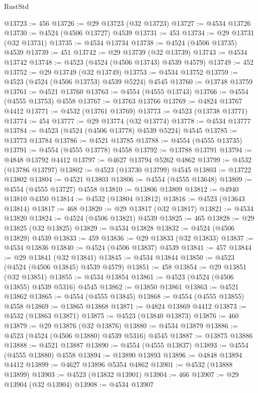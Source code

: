 \begin{lexlean}{RustStd}
\begin{coremodule}
@13723 := 456
@13726 := @29 @13723 (@32 @13723)
@13727 := @4534 @13726
@13730 := @4524 (@4506 @13727) @4539
@13731 := 453
@13734 := @29 @13731 (@32 @13731)
@13735 := @4534 @13734
@13738 := @4524 (@4506 @13735) @4539
@13739 := 451
@13742 := @29 @13739 (@32 @13739)
@13743 := @4534 @13742
@13748 := @4523 (@4524 (@4506 @13743) @4539 @4579)
@13749 := 452
@13752 := @29 @13749 (@32 @13749)
@13753 := @4534 @13752
@13759 := @4523 (@4524 (@4506 @13753) @4539 @5224) @4545
@13760 := @13748 @13759
@13761 := @4521 @13760
@13763 := @4554 (@4555 @13743)
@13766 := @4554 (@4555 @13753) @4558
@13767 := @13763 @13766
@13769 := @4824 @13767 @4412
@13771 := @4532 (@13761 @13769)
@13773 := @4523 (@13738 @13771)
@13774 := 454
@13777 := @29 @13774 (@32 @13774)
@13778 := @4534 @13777
@13784 := @4523 (@4524 (@4506 @13778) @4539 @5224) @4545
@13785 := @13773 @13784
@13786 := @4521 @13785
@13788 := @4554 (@4555 @13735)
@13791 := @4554 (@4555 @13778) @4558
@13792 := @13788 @13791
@13794 := @4848 @13792 @4412
@13797 := @4627 @13794 @5262 @4862
@13799 := @4532 (@13786 @13797)
@13802 := @4523 (@13730 @13799) @4545
@13803 := @13722 @13802
@13804 := @4521 @13803
@13806 := @4554 (@4555 @13648)
@13809 := @4554 (@4555 @13727) @4558
@13810 := @13806 @13809
@13812 := @4940 @13810 @4350
@13814 := @4532 (@13804 @13812)
@13816 := @4523 (@13643 @13814)
@13817 := 468
@13820 := @29 @13817 (@32 @13817)
@13821 := @4534 @13820
@13824 := @4524 (@4506 @13821) @4539
@13825 := 465
@13828 := @29 @13825 (@32 @13825)
@13829 := @4534 @13828
@13832 := @4524 (@4506 @13829) @4539
@13833 := 459
@13836 := @29 @13833 (@32 @13833)
@13837 := @4534 @13836
@13840 := @4524 (@4506 @13837) @4539
@13841 := 457
@13844 := @29 @13841 (@32 @13841)
@13845 := @4534 @13844
@13850 := @4523 (@4524 (@4506 @13845) @4539 @4579)
@13851 := 458
@13854 := @29 @13851 (@32 @13851)
@13855 := @4534 @13854
@13861 := @4523 (@4524 (@4506 @13855) @4539 @5316) @4545
@13862 := @13850 @13861
@13863 := @4521 @13862
@13865 := @4554 (@4555 @13845)
@13868 := @4554 (@4555 @13855) @4558
@13869 := @13865 @13868
@13871 := @4824 @13869 @4412
@13873 := @4532 (@13863 @13871)
@13875 := @4523 (@13840 @13873)
@13876 := 460
@13879 := @29 @13876 (@32 @13876)
@13880 := @4534 @13879
@13886 := @4523 (@4524 (@4506 @13880) @4539 @5316) @4545
@13887 := @13875 @13886
@13888 := @4521 @13887
@13890 := @4554 (@4555 @13837)
@13893 := @4554 (@4555 @13880) @4558
@13894 := @13890 @13893
@13896 := @4848 @13894 @4412
@13899 := @4627 @13896 @5354 @4862
@13901 := @4532 (@13888 @13899)
@13903 := @4523 (@13832 @13901)
@13904 := 466
@13907 := @29 @13904 (@32 @13904)
@13908 := @4534 @13907

\end{coremodule}
\end{lexlean}
